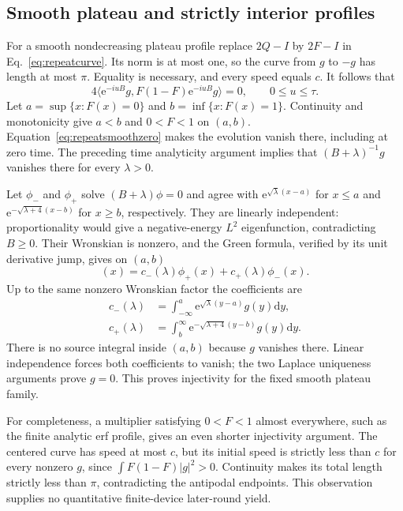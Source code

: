 \documentclass[aps,pra,reprint,superscriptaddress,longbibliography]{revtex4-2}
\newcommand{\dd}{\mathrm d}
\newcommand{\ee}{\mathrm e}
\newcommand{\ip}[2]{\langle#1,#2\rangle}
\begin{document}
\subsection{Smooth plateau and strictly interior profiles}

For a smooth nondecreasing plateau profile replace $2Q-I$ by
$2F-I$ in Eq.~\eqref{eq:repeatcurve}. Its norm is at most one,
so the curve from $g$ to $-g$ has length at most $\pi$. Equality
is necessary, and every speed equals $c$. It follows that
\begin{equation}
 4\ip{\ee^{-iuB}g}{F(1-F)\ee^{-iuB}g}=0,
                  \qquad0\le u\le\tau.                 \label{eq:repeatsmoothzero}
\end{equation}
Let $a=\sup\{x:F(x)=0\}$ and $b=\inf\{x:F(x)=1\}$.
Continuity and monotonicity give $a<b$ and $0<F<1$ on $(a,b)$.
Equation~\eqref{eq:repeatsmoothzero} makes the evolution vanish
there, including at zero time. The preceding time analyticity
argument implies that $(B+\lambda)^{-1}g$ vanishes there for
every $\lambda>0$.

Let $\phi_-$ and $\phi_+$ solve $(B+\lambda)\phi=0$ and agree
with $\ee^{\sqrt\lambda(x-a)}$ for $x\le a$ and
$\ee^{-\sqrt{\lambda+4}(x-b)}$ for $x\ge b$, respectively.
They are linearly independent: proportionality would give a
negative-energy $L^2$ eigenfunction, contradicting $B\ge0$.
Their Wronskian is nonzero, and the Green formula, verified by
its unit derivative jump, gives on $(a,b)$
\begin{equation}
 [(B+\lambda)^{-1}g](x)=c_-(\lambda)\phi_+(x)
                                      +c_+(\lambda)\phi_-(x).
                                                        \label{eq:repeatsmoothgreen}
\end{equation}
Up to the same nonzero Wronskian factor the coefficients are
\begin{align}
 c_-(\lambda)&=\int_{-\infty}^a
                \ee^{\sqrt\lambda(y-a)}g(y)\dd y,\nonumber\\
 c_+(\lambda)&=\int_b^\infty
                \ee^{-\sqrt{\lambda+4}(y-b)}g(y)\dd y.
                                                        \label{eq:repeatlaplace}
\end{align}
There is no source integral inside $(a,b)$ because $g$ vanishes
there. Linear independence forces both coefficients to vanish;
the two Laplace uniqueness arguments prove $g=0$.
This proves injectivity for the fixed smooth plateau family.

For completeness, a multiplier satisfying $0<F<1$ almost
everywhere, such as the finite analytic erf profile, gives an
even shorter injectivity argument. The centered curve has speed
at most $c$, but its initial speed is strictly less than $c$ for
every nonzero $g$, since $\int F(1-F)|g|^2>0$.
Continuity makes its total length strictly less than $\pi$,
contradicting the antipodal endpoints. This observation supplies
no quantitative finite-device later-round yield.
\end{document}
